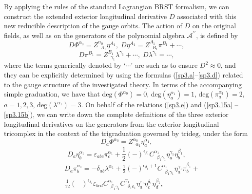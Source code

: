 \documentclass[a4paper,12pt]{article}
\begin{document}
By applying the rules of the standard Lagrangian BRST formalism, we can
construct the extended exterior longitudinal derivative $D$ associated with
this new reducible description of the gauge orbits. The action of $D$ on the
original fields, as well as on the generators of the polynomial algebra $%
\mathcal{A}^{\prime \prime }$, is defined by 
\begin{equation}
D\Phi ^{\alpha _{0}}=Z_{\;\;A_{1}}^{\alpha _{0}}\eta ^{A_{1}},\;D\eta
^{A_{1}}=Z_{\;\;B_{1}}^{A_{1}}\pi ^{B_{1}}+\cdots ,  \label{sp3.15a}
\end{equation}
\begin{equation}
D\pi ^{B_{1}}=Z_{\;\;\gamma _{1}}^{B_{1}}\lambda ^{\gamma _{1}}+\cdots
,\;D\lambda ^{\gamma _{1}}=\cdots ,  \label{sp3.15b}
\end{equation}
where the terms generically denoted by `$\cdots $' are such as to ensure $%
D^{2}\approx 0$, and they can be explicitly determined by using the formulas
(\ref{sp3.a}--\ref{sp3.d}) related to the gauge structure of the
investigated theory. In terms of the accompanying simple graduation, we have
that $\mathrm{deg}\left( \Phi ^{\alpha _{0}}\right) =0$, $\mathrm{deg}\left(
\eta _{a}^{\alpha _{1}}\right) =1$, $\mathrm{deg}\left( \pi _{a}^{\alpha
_{1}}\right) =2$, $a=1,2,3$, $\mathrm{deg}\left( \lambda ^{\alpha
_{1}}\right) =3$. On behalf of the relations (\ref{sp3.e}) and (\ref{sp3.15a}%
--\ref{sp3.15b}), we can write down the complete definitions of the three
exterior longitudinal derivatives on the generators from the exterior
longitudinal tricomplex in the context of the trigraduation governed by $%
\mathrm{trideg}$, under the form 
\begin{equation}
D_{a}\Phi ^{\alpha _{0}}=Z_{\;\;\alpha _{1}}^{\alpha _{0}}\eta _{a}^{\alpha
_{1}},  \label{sp3.18}
\end{equation}
\begin{equation}
D_{a}\eta _{b}^{\alpha _{1}}=\varepsilon _{abc}\pi _{c}^{\alpha _{1}}+\frac{1%
}{2}\left( -\right) ^{\epsilon _{\beta _{1}}}C_{\;\;\beta _{1}\gamma
_{1}}^{\alpha _{1}}\eta _{a}^{\gamma _{1}}\eta _{b}^{\beta _{1}},
\label{sp3.19}
\end{equation}
\begin{eqnarray}
&&D_{a}\pi _{b}^{\alpha _{1}}=-\delta _{ab}\lambda ^{\alpha _{1}}+\frac{1}{2}
\left( -\right) ^{\epsilon _{\beta _{1}}+1}C_{\;\;\beta _{1}\gamma
_{1}}^{\alpha _{1}}\eta _{a}^{\gamma _{1}}\pi _{b}^{\beta _{1}}+  \nonumber
\\
&&\frac{1}{12}\left( -\right) ^{\epsilon _{\delta _{1}}}\varepsilon
_{bcd}C_{\;\;\beta _{1}\gamma _{1}}^{\alpha _{1}}C_{\;\;\delta
_{1}\varepsilon _{1}}^{\gamma _{1}}\eta _{a}^{\varepsilon _{1}}\eta
_{c}^{\delta _{1}}\eta _{d}^{\beta _{1}},  \label{sp3.20}
\end{eqnarray}
\end{document}
